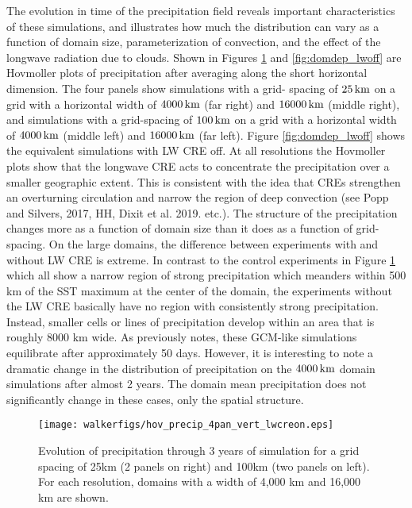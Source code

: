 \documentclass[11pt]{article}   	%
\begin{document}
The evolution in time of the precipitation field reveals important characteristics of these simulations, and 
illustrates how much the distribution can vary as a function of domain size, parameterization of convection, 
and the effect of the longwave radiation due to clouds. 
Shown in Figures {\ref{fig:domdep}} and {\ref{fig:domdep_lwoff}} are Hovmoller plots of precipitation after 
averaging along the short horizontal dimension.  The four panels show simulations with a grid-
spacing of $25\, \rm{km}$ on a grid with a horizontal width of $4000\, \rm{km}$ (far right) and $16000\, \rm{km}$ (middle right), and 
simulations with a grid-spacing of $100\, \rm{km}$ on a grid with a horizontal width of $4000\, \rm{km}$ (middle left) and 
$16000\, \rm{km}$ (far left).  Figure  {\ref{fig:domdep_lwoff}} shows the equivalent simulations with LW CRE off.    
 At all resolutions the Hovmoller plots show that the longwave CRE acts to concentrate the 
precipitation over a smaller geographic extent.   This is consistent with the idea that CREs strengthen an overturning circulation and
narrow the region of deep convection (see Popp and Silvers, 2017, HH, Dixit et al. 2019.  etc.).
The structure of the precipitation changes more as a function of domain size than it does as a function of grid-spacing. 
On the large domains, the difference between experiments with and without LW CRE is extreme.  In contrast to the control 
experiments in Figure {\ref{fig:domdep}} which all show a narrow region of strong precipitation which meanders within 
500 km of the SST maximum at the center of the domain,  
the experiments without the LW CRE basically have no region with consistently strong precipitation.  Instead, 
smaller cells or lines of precipitation develop within an area that is roughly 8000 km wide.  As previously notes, these
GCM-like simulations equilibrate after approximately 50 days.  However, it is interesting to note a dramatic change in 
the distribution of precipitation on the $4000\, \rm{km}$ domain simulations after almost 2 years.   The domain mean 
precipitation does not significantly change in these cases, only the spatial structure.  

\begin{figure}
  \texttt{[image: walkerfigs/hov\_precip\_4pan\_vert\_lwcreon.eps]}
  \caption{Evolution of precipitation through 3 years of simulation for a grid spacing of 25km (2 panels on right) and
  100km (two panels on left).  For each resolution, domains with a width of 4,000 km and 16,000 km are shown.}
  \label{fig:domdep}
\end{figure}
\end{document}
